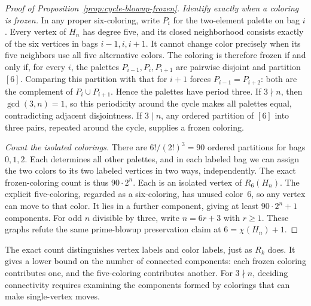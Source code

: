 \begin{proof}[Proof of Proposition~\ref{prop:cycle-blowup-frozen}]
\textit{Identify exactly when a coloring is frozen.}
In any proper six-coloring, write $P_i$ for the two-element palette
on bag $i$. Every vertex of $H_n$ has degree five, and its closed
neighborhood consists exactly of the six vertices in bags
$i-1,i,i+1$. It cannot change color precisely when its five
neighbors use all five alternative colors. The coloring is
therefore frozen if and only if, for every $i$, the palettes
$P_{i-1},P_i,P_{i+1}$ are pairwise disjoint and partition $[6]$.
Comparing this partition with that for $i+1$ forces
$P_{i-1}=P_{i+2}$: both are the complement of $P_i\cup P_{i+1}$.
Hence the palettes have period three. If $3\nmid n$, then
$\gcd(3,n)=1$, so this periodicity around the cycle makes all
palettes equal, contradicting adjacent disjointness. If $3\mid n$,
any ordered partition of $[6]$ into three pairs, repeated around
the cycle, supplies a frozen coloring.

\textit{Count the isolated colorings.}
There are $6!/(2!)^3=90$ ordered partitions for bags $0,1,2$.
Each determines all other palettes, and in each labeled bag we can assign the
two colors to its two labeled vertices in two
ways, independently. The exact frozen-coloring count is thus
$90\cdot2^n$. Each is an isolated vertex of $R_6(H_n)$. The explicit
five-coloring, regarded as a six-coloring, has unused color~6, so
any vertex can move to that color. It lies in a further component,
giving at least $90\cdot2^n+1$ components. For odd $n$ divisible by
three, write $n=6r+3$ with $r\ge1$. These graphs refute the same
prime-blowup preservation claim at $6=\chi(H_n)+1$.
\end{proof}

The exact count distinguishes vertex labels and color labels, just as
$R_k$ does. It gives a lower bound on the number of connected components:
each frozen coloring contributes one, and the five-coloring contributes
another. For $3\nmid n$, deciding connectivity requires examining the
components formed by colorings that can make single-vertex moves.
